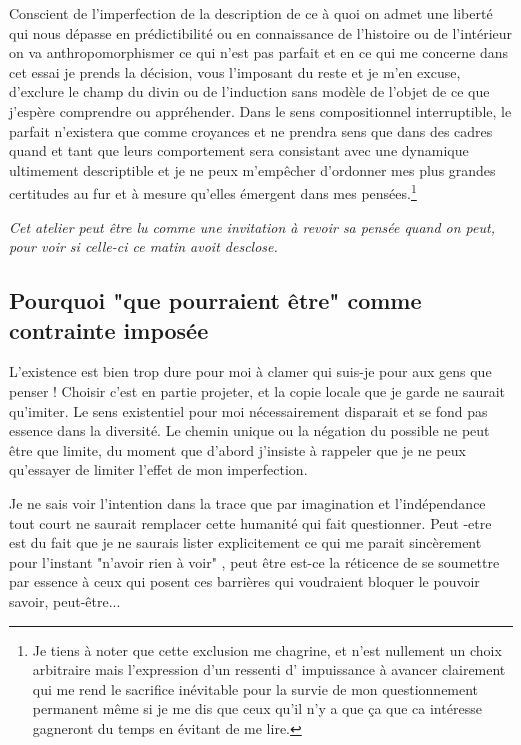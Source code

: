 \documentclass{article}
\begin{document}
Conscient de l'imperfection de la description de ce à quoi on admet une liberté qui nous dépasse en prédictibilité ou en connaissance de l'histoire ou de l'intérieur on va anthropomorphismer ce qui n'est pas parfait et en ce qui me concerne dans cet essai je prends   la décision, vous l'imposant du reste et je m'en excuse, d'exclure le champ %
du divin ou de l'induction sans modèle de l'objet de ce que j'espère comprendre ou appréhender. Dans le sens compositionnel interruptible, le parfait n'existera que comme croyances et ne prendra sens que  dans des cadres quand et tant que leurs comportement sera consistant avec une dynamique ultimement descriptible et  je ne peux m'empêcher d'ordonner mes plus grandes certitudes au fur et à mesure qu'elles émergent dans mes pensées.\footnote{ Je tiens à noter que cette exclusion me chagrine, et n'est nullement un choix arbitraire mais l'expression d'un ressenti d' impuissance à avancer clairement qui me rend le sacrifice inévitable pour la survie de mon questionnement permanent même si je me dis que ceux qu'il n'y a  que ça que ca intéresse gagneront du temps en évitant de me lire.}

\emph{Cet atelier peut être lu comme une invitation à revoir sa pensée quand on peut, pour voir si celle-ci ce matin avoit desclose.}

\subsection{Pourquoi "que pourraient être" comme contrainte imposée}

L'existence est bien trop dure pour moi à clamer qui suis-je pour aux gens que penser ! Choisir c'est en partie  projeter, et la copie locale que je garde ne saurait qu'imiter. Le sens existentiel pour moi nécessairement disparait et se fond pas essence dans la diversité. Le chemin unique  ou la négation du possible ne peut être  que limite, du moment que d'abord j'insiste à rappeler que je ne peux qu'essayer de limiter l'effet de mon imperfection. 

 Je ne sais voir l'intention dans  la trace que par imagination et l'indépendance tout court ne saurait remplacer cette humanité  qui fait questionner.    
Peut -etre est  du fait que je ne saurais lister explicitement ce qui me parait sincèrement pour l'instant "n'avoir rien à voir" , peut être est-ce la réticence de se soumettre par essence à ceux qui posent ces barrières qui voudraient bloquer le pouvoir savoir, peut-être...
\end{document}
